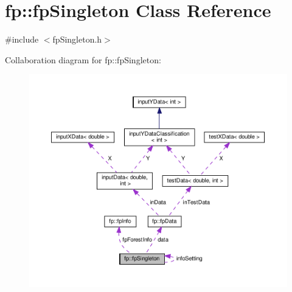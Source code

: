 \hypertarget{classfp_1_1fpSingleton}{}\section{fp\+:\+:fp\+Singleton Class Reference}
\label{classfp_1_1fpSingleton}


{\ttfamily \#include $<$fp\+Singleton.\+h$>$}



Collaboration diagram for fp\+:\+:fp\+Singleton\+:\nopagebreak
\begin{figure}[H]
\begin{center}
\leavevmode
\includegraphics[width=350pt]{classfp_1_1fpSingleton__coll__graph}
\end{center}
\end{figure}

